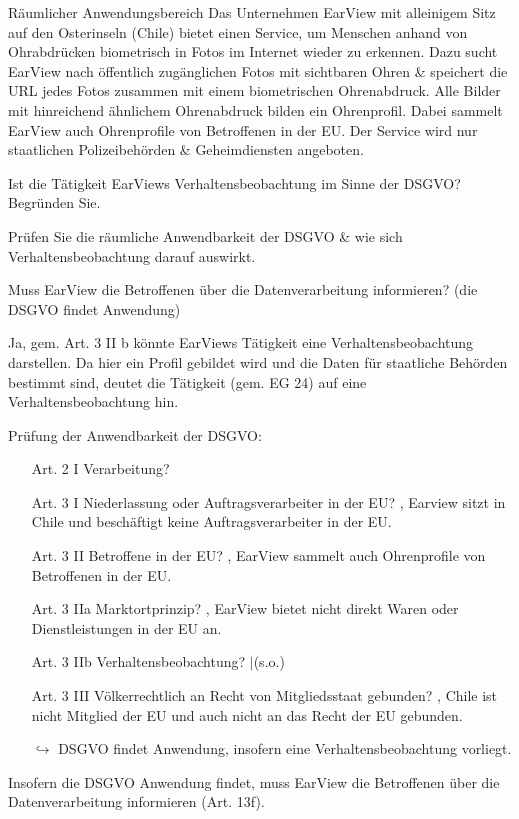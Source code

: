 \documentclass{exercisesheet}
\begin{document}
\begin{eexercises}{Räumlicher Anwendungsbereich}{
    Das Unternehmen EarView mit alleinigem Sitz auf den Osterinseln (Chile) bietet einen Service, um Menschen anhand von Ohrabdrücken biometrisch in Fotos im Internet wieder zu erkennen. Dazu sucht EarView nach öffentlich zugänglichen Fotos mit sichtbaren Ohren \& speichert die URL jedes Fotos zusammen mit einem biometrischen Ohrenabdruck. Alle Bilder mit hinreichend ähnlichem Ohrenabdruck bilden ein Ohrenprofil. Dabei sammelt EarView auch Ohrenprofile von Betroffenen in der EU. Der Service wird nur staatlichen Polizeibehörden \& Geheimdiensten angeboten.
  }
  \item Ist die Tätigkeit EarViews Verhaltensbeobachtung im Sinne der DSGVO? Begründen Sie.
  \item Prüfen Sie die räumliche Anwendbarkeit der DSGVO \& wie sich Verhaltensbeobachtung darauf auswirkt.
  \item Muss EarView die Betroffenen über die Datenverarbeitung informieren? (die DSGVO findet Anwendung)
\end{eexercises}

\begin{solutions}
  \item Ja, gem. Art. 3 II b könnte EarViews Tätigkeit eine Verhaltensbeobachtung darstellen. Da hier ein Profil gebildet wird und die Daten für staatliche Behörden bestimmt sind, deutet die Tätigkeit (gem. EG 24) auf eine Verhaltensbeobachtung hin.
  \item Prüfung der Anwendbarkeit der DSGVO:
  \begin{itemize}
    \item[Art. 2 I] Verarbeitung? \checkmark
    \item[Art. 3 I] Niederlassung oder Auftragsverarbeiter in der EU? \xmark, Earview sitzt in Chile und beschäftigt keine Auftragsverarbeiter in der EU.
    \item[Art. 3 II] Betroffene in der EU? \checkmark, EarView sammelt auch Ohrenprofile von Betroffenen in der EU.
    \item[Art. 3 IIa] Marktortprinzip? \xmark, EarView bietet nicht direkt Waren oder Dienstleistungen in der EU an.
    \item[Art. 3 IIb] Verhaltensbeobachtung? \checkmark$|$\xmark (s.o.)
    \item[Art. 3 III] Völkerrechtlich an Recht von Mitgliedsstaat gebunden? \xmark, Chile ist nicht Mitglied der EU und auch nicht an das Recht der EU gebunden.
    \item[$\hookrightarrow$] DSGVO findet Anwendung, insofern eine Verhaltensbeobachtung vorliegt.
  \end{itemize}
  \item Insofern die DSGVO Anwendung findet, muss EarView die Betroffenen über die Datenverarbeitung informieren (Art. 13f).
\end{solutions}
\end{document}

